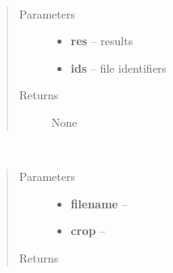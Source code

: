 \documentclass[a4paper,11pt,english]{sphinxmanual}
\begin{document}
\begin{fulllineitems}
\label{analysis:analysis.analyseSpotMeasurements.plotGaussianResults}~\begin{quote}\begin{description}
\item[{Parameters}] \leavevmode\begin{itemize}
\item {} 
\textbf{res} -- results

\item {} 
\textbf{ids} -- file identifiers

\end{itemize}

\item[{Returns}] \leavevmode
None

\end{description}\end{quote}

\end{fulllineitems}


\begin{fulllineitems}
\label{analysis:analysis.analyseSpotMeasurements.readData}~\begin{quote}\begin{description}
\item[{Parameters}] \leavevmode\begin{itemize}
\item {} 
\textbf{filename} -- 

\item {} 
\textbf{crop} -- 

\end{itemize}

\item[{Returns}] \leavevmode


\end{description}\end{quote}

\end{fulllineitems}

\end{document}
